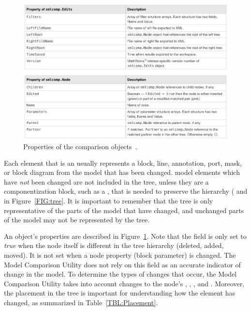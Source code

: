 \documentclass{article}
\makeatletter
\newcommand{\ToolName}{Model Comparison Utility\@\xspace}
\newcommand{\NodeObj}{\keyword{xmlcomp.Node}\@\xspace}
\makeatother
\begin{document}
\begin{figure}[!htb]
  \centering
	\includegraphics[width=\textwidth,]{../figs/ObjectTable}
	\caption{Properties of the comparison objects~\cite{CompareXML}.}
	\label{FIG:ObjectTable}
\end{figure}

Each element that is an \NodeObj usually represents a block, line, annotation, port, mask, or block diagram from the \Simulink model that has been changed. \Simulink model elements which have \emph{not} been changed are not included in the tree, unless they are a componentization block, such as a \subsystem, that is needed to preserve the hierarchy (\eg {} and  in Figure~\ref{FIG:tree}. It is important to remember that the tree is only representative of the parts of the model that have changed, and unchanged parts of the model may not be represented by the tree.

An \NodeObj object's properties are described in Figure~\ref{FIG:ObjectTable}. Note that the  field is only set to \textit{true} when the node itself is different in the tree hierarchy (deleted, added, moved). It is not set when a node property (block parameter) is changed. The \ToolName does not rely on this field as an accurate indicator of change in the model. To determine the types of changes that occur, the \ToolName takes into account changes to the node's , , , and . Moreover, the placement in the tree is important for understanding how the element has changed, as summarized in Table~\ref{TBL:Placement}.
\end{document}
